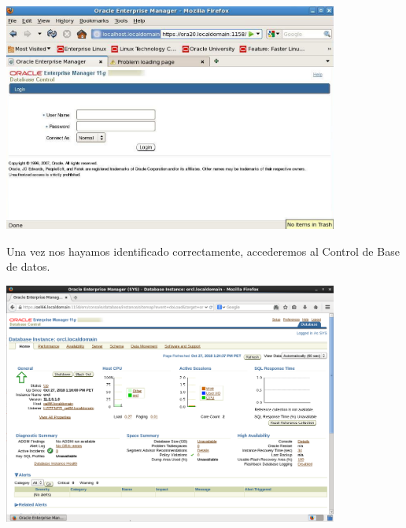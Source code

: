 \begin{enumerate}
\begin{center}
  \includegraphics[width=11cm]{Imagenes/Oracle_Database/Paso_40.png}
\end{center}
Una vez nos hayamos identificado correctamente, accederemos al Control de Base de datos.
\begin{center}
  \includegraphics[width=11cm]{Imagenes/Oracle_Database/Paso_40_2.png}
\end{center}
\vspace{12pt}\\

\end{enumerate}
